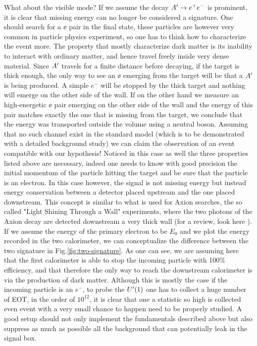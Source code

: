 What about the visible mode? If we assume the decay $A' \to e^+e^-$ is prominent, it is clear that missing energy can no longer be considered a signature. One should search for a $\ee$ pair in the final state, these particles are however very common in particle physics experiment, so one has to think how to characterize the event more. The property that mostly characterize dark matter is its inability to interact with ordinary matter, and hence travel freely inside very dense material. Since $A'$ travels for a finite distance before decaying, if the target is thick enough, the only way to see an $\ee$ emerging from the target will be that a $A'$ is being produced. A simple $e^-$ will be stopped by the thick target and nothing will emerge on the other side of the wall. If on the other hand we measure an high-energetic $\ee$ pair emerging on the other side of the wall and the energy of this pair matches exactly the one that is missing from the target, we conclude that the energy was transported outside the volume using a neutral boson. Assuming that no such channel exist in the standard model (which is to be demonstrated with a detailed background study) we can claim the observation of an event compatible with our hypothesis! Noticed in this case as well the three properties listed above are necessary, indeed one needs to know with good precision the initial momentum of the particle hitting the target and be sure that the particle is an electron. In this case however, the signal is not missing energy but instead energy conservation between a detector placed upstream and the one placed downstream. This concept is similar to what is used for Axion searches, the so called "Light Shining Through a Wall" experiments, where the two photons of the Axion decay are detected downstream a very thick wall (for a review, look here \cite{Jaeckel:2010ni}).
If we assume the energy of the primary electron to be $E_0$ and we plot the energy recorded in the two calorimeter, we can conceptualize the difference between the two signature in Fig.\ref{fig:two-signature}. As one can see, we are assuming here that the first calorimeter is able to stop the incoming particle with 100\% efficiency, and that therefore the only way to reach the downstream calorimeter is via the production of dark matter. Although this is mostly the case if the incoming particle is an $e^-$, to probe the $U'(1)$ one has to collect a huge number of EOT, in the order of $10^{12}$, it is clear that one a statistic so high is collected even event with a very small chance to happen need to be properly studied. A good setup should not only implement the fundamentals described above but also suppress as much as possible all the background that can potentially leak in the signal box.


